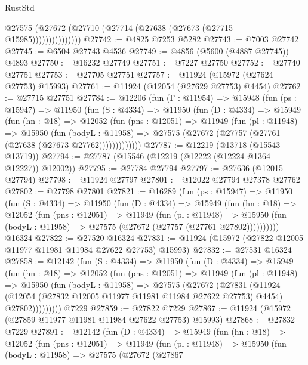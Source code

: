\begin{lexlean}{RustStd}
\begin{coremodule}
                    @27575 (@27672 (@27710 (@27714 (@27638 (@27673 (@27715 @15985)))))))))))))))
@27742 := @4825 @7253 @5282
@27743 := @7003 @27742
@27745 := @6504 @27743 @4536
@27749 := @4856 (@5600 (@4887 @27745)) @4893
@27750 := @16232 @27749
@27751 := @7227 @27750
@27752 := @27740 @27751
@27753 := @27705 @27751
@27757 := @11924 (@15972 (@27624 @27753) @15993)
@27761 := @11924 (@12054 (@27629 @27753) @4454)
@27762 := @27715 @27751
@27784 := @12206
    (fun (Γ : @11954) =>
    @15948
      (fun (ps : @15947) =>
      @11950
        (fun (S : @4334) =>
        @11950
          (fun (D : @4334) =>
          @15949
            (fun (hn : @18) =>
            @12052
              (fun (pns : @12051) =>
              @11949
                (fun (pl : @11948) =>
                @15950
                  (fun (bodyL : @11958) =>
                  @27575 (@27672 (@27757 (@27761 (@27638 (@27673 @27762)))))))))))))
@27787 := @12219 (@13718 (@15543 @13719))
@27794 := @27787 (@15546 (@12219 (@12222 (@12224 @1364 @12227)) @12002))
@27795 := @27784 @27794
@27797 := @27636 (@12015 @27794)
@27798 := @11924 @27797
@27801 := @12022 @27794 @27378 @27762
@27802 := @27798 @27801
@27821 := @16289
    (fun (ps : @15947) =>
    @11950
      (fun (S : @4334) =>
      @11950
        (fun (D : @4334) =>
        @15949
          (fun (hn : @18) =>
          @12052
            (fun (pns : @12051) =>
            @11949
              (fun (pl : @11948) =>
              @15950 (fun (bodyL : @11958) => @27575 (@27672 (@27757 (@27761 @27802))))))))))
    @16324
@27822 := @27520 @16324
@27831 := @11924 (@15972 (@27822 @12005 @11977 @11981 @11984 @27622 @27753) @15993)
@27832 := @27531 @16324
@27858 := @12142
    (fun (S : @4334) =>
    @11950
      (fun (D : @4334) =>
      @15949
        (fun (hn : @18) =>
        @12052
          (fun (pns : @12051) =>
          @11949
            (fun (pl : @11948) =>
            @15950
              (fun (bodyL : @11958) =>
              @27575
                (@27672
                  (@27831
                    (@11924
                      (@12054 (@27832 @12005 @11977 @11981 @11984 @27622 @27753) @4454)
                      @27802)))))))))
    @7229
@27859 := @27822 @7229
@27867 := @11924 (@15972 (@27859 @11977 @11981 @11984 @27622 @27753) @15993)
@27868 := @27832 @7229
@27891 := @12142
    (fun (D : @4334) =>
    @15949
      (fun (hn : @18) =>
      @12052
        (fun (pns : @12051) =>
        @11949
          (fun (pl : @11948) =>
          @15950
            (fun (bodyL : @11958) =>
            @27575
              (@27672
                (@27867

\end{coremodule}
\end{lexlean}
